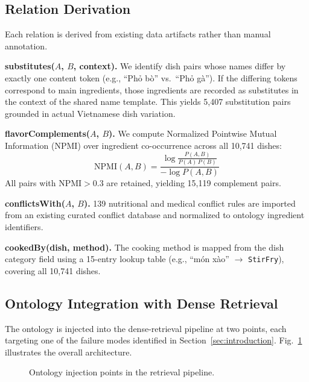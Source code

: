 \subsection{Relation Derivation}
\label{ssec:relations}

Each relation is derived from existing data artifacts rather than manual annotation.

\textbf{substitutes($A$, $B$, context).}
We identify dish pairs whose names differ by exactly one content token (e.g., ``Ph\h{o} b\`{o}'' vs.\ ``Ph\h{o} g\`{a}''). If the differing tokens correspond to main ingredients, those ingredients are recorded as substitutes in the context of the shared name template. This yields 5{,}407 substitution pairs grounded in actual Vietnamese dish variation.

\textbf{flavorComplements($A$, $B$).}
We compute Normalized Pointwise Mutual Information (NPMI) over ingredient co-occurrence across all 10{,}741 dishes:
%
\begin{equation}
\label{eq:npmi}
\text{NPMI}(A, B) = \frac{\log \frac{P(A, B)}{P(A)\,P(B)}}{-\log P(A, B)}
\end{equation}
%
All pairs with $\text{NPMI} > 0.3$ are retained, yielding 15{,}119 complement pairs.

\textbf{conflictsWith($A$, $B$).}
139 nutritional and medical conflict rules are imported from an existing curated conflict database and normalized to ontology ingredient identifiers.

\textbf{cookedBy(dish, method).}
The cooking method is mapped from the dish category field using a 15-entry lookup table (e.g., ``m\'{o}n x\`{a}o'' $\to$ \texttt{StirFry}), covering all 10{,}741 dishes.

\subsection{Ontology Integration with Dense Retrieval}
\label{ssec:integration}

The ontology is injected into the dense-retrieval pipeline at two points, each targeting one of the failure modes identified in Section~\ref{sec:introduction}. Fig.~\ref{fig:pipeline} illustrates the overall architecture.

\begin{figure}[t]
\centering
\caption{Ontology injection points in the retrieval pipeline.}
\label{fig:pipeline}
\end{figure}

